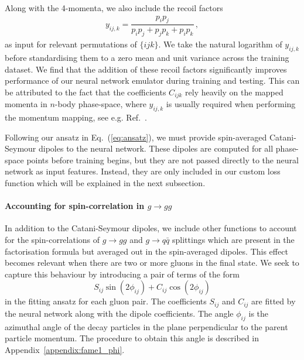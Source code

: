 \documentclass[main.tex]{subfiles}
\begin{document}
Along with the 4-momenta, we also include the recoil factors
\begin{eqnarray}\label{eq:recoil_factor}
    y_{ij,k} = \dfrac{p_{i}p_{j}}{p_{i}p_{j} + p_{j}p_{k} + p_{i}p_{k}} \, ,
\end{eqnarray}
as input for relevant permutations of $\{ijk\}$.
We take the natural logarithm of $y_{ij,k}$ before standardising them to a zero mean and unit variance across the training dataset.
We find that the addition of these recoil factors significantly improves performance of our neural network emulator during training and testing.
This can be attributed to the fact that the coefficients $C_{ijk}$ rely heavily on the mapped momenta in $n$-body phase-space, where $y_{ij,k}$ is usually required when performing the momentum mapping, see e.g. Ref.~\cite{Catani:1996vz}.

Following our ansatz in Eq.~(\ref{eq:ansatz}), we must provide spin-averaged Catani-Seymour dipoles to the neural network. These dipoles are computed for all phase-space points before training begins, but they are not passed directly to the neural network as input features. Instead, they are only included in our custom loss function which will be explained in the next subsection.

\paragraph*{Accounting for spin-correlation in $g \rightarrow gg$}
In addition to the Catani-Seymour dipoles, we include other functions to account for the spin-correlations of $g \rightarrow gg$ and $g \rightarrow q\bar q$ splittings which are present in the factorisation formula but averaged out in the spin-averaged dipoles.
This effect becomes relevant when there are two or more gluons in the final state.
We seek to capture this behaviour by introducing a pair of terms of the form 
\begin{equation}
S_{ij} \sin\left(2 \phi_{ij}\right) + C_{ij} \cos\left(2\phi_{ij}\right)
\end{equation}
in the fitting ansatz for each gluon pair. The coefficients $S_{ij}$ and $C_{ij}$ are fitted by the neural network along with the dipole coefficients. The angle $\phi_{ij}$ is the azimuthal angle of the decay particles in the plane perpendicular to the parent particle momentum. The procedure to obtain this angle is described in Appendix~\ref{appendix:fame1_phi}.
\end{document}
